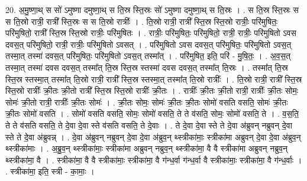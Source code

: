 \documentclass[17pt]{extarticle}
\begin{document}
20. अ॒मु॒ष्णा॒थ् स सो॑ ऽमुष्णा दमुष्णा॒थ् स ति॒स्र स्ति॒स्रः सो॑ ऽमुष्णा दमुष्णा॒थ् स ति॒स्रः । . स ति॒स्र स्ति॒स्रः स स ति॒स्रो रात्री॒ रात्री᳚ स्ति॒स्रः स स ति॒स्रो रात्रीः᳚ । . ति॒स्रो रात्री॒ रात्री᳚ स्ति॒स्र स्ति॒स्रो रात्रीः॒ परि॑मुषितः॒ परि॑मुषितो॒ रात्री᳚ स्ति॒स्र स्ति॒स्रो रात्रीः॒ परि॑मुषितः । . रात्रीः॒ परि॑मुषितः॒ परि॑मुषितो॒ रात्री॒ रात्रीः॒ परि॑मुषितो ऽवस दवस॒त् परि॑मुषितो॒ रात्री॒ रात्रीः॒ परि॑मुषितो ऽवसत् । . परि॑मुषितो ऽवस दवस॒त् परि॑मुषितः॒ परि॑मुषितो ऽवस॒त् तस्मा॒त् तस्मा॑ दवस॒त् परि॑मुषितः॒ परि॑मुषितो ऽवस॒त् तस्मा᳚त् । . परि॑मुषित॒ इति॒ परि॑ - मु॒षि॒तः॒ । . अ॒व॒स॒त् तस्मा॒त् तस्मा॑ दवस दवस॒त् तस्मा᳚त् ति॒स्र स्ति॒स्र स्तस्मा॑ दवस दवस॒त् तस्मा᳚त् ति॒स्रः । . तस्मा᳚त् ति॒स्र स्ति॒स्र स्तस्मा॒त् तस्मा᳚त् ति॒स्रो रात्री॒ रात्री᳚ स्ति॒स्र स्तस्मा॒त् तस्मा᳚त् ति॒स्रो रात्रीः᳚ । . ति॒स्रो रात्री॒ रात्री᳚ स्ति॒स्र स्ति॒स्रो रात्रीः᳚ क्री॒तः क्री॒तो रात्री᳚ स्ति॒स्र स्ति॒स्रो रात्रीः᳚ क्री॒तः । . रात्रीः᳚ क्री॒तः क्री॒तो रात्री॒ रात्रीः᳚ क्री॒तः सोमः॒ सोमः॑ क्री॒तो रात्री॒ रात्रीः᳚ क्री॒तः सोमः॑ । . क्री॒तः सोमः॒ सोमः॑ क्री॒तः क्री॒तः सोमो॑ वसति वसति॒ सोमः॑ क्री॒तः क्री॒तः सोमो॑ वसति । . सोमो॑ वसति वसति॒ सोमः॒ सोमो॑ वसति॒ ते ते व॑सति॒ सोमः॒ सोमो॑ वसति॒ ते । . व॒स॒ति॒ ते ते व॑सति वसति॒ ते दे॒वा दे॒वा स्ते व॑सति वसति॒ ते दे॒वाः । . ते दे॒वा दे॒वा स्ते ते दे॒वा अ॑ब्रुवन् नब्रुवन् दे॒वा स्ते ते दे॒वा अ॑ब्रुवन्न् । . दे॒वा अ॑ब्रुवन् नब्रुवन् दे॒वा दे॒वा अ॑ब्रुव॒न् थ्स्त्रीका॑माः॒ स्त्रीका॑मा अब्रुवन् दे॒वा दे॒वा अ॑ब्रुव॒न् थ्स्त्रीका॑माः । . अ॒ब्रु॒व॒न् थ्स्त्रीका॑माः॒ स्त्रीका॑मा अब्रुवन् नब्रुव॒न् थ्स्त्रीका॑मा॒ वै वै स्त्रीका॑मा अब्रुवन् नब्रुव॒न् थ्स्त्रीका॑मा॒ वै । . स्त्रीका॑मा॒ वै वै स्त्रीका॑माः॒ स्त्रीका॑मा॒ वै ग॑न्ध॒र्वा ग॑न्ध॒र्वा वै स्त्रीका॑माः॒ स्त्रीका॑मा॒ वै ग॑न्ध॒र्वाः । . स्त्रीका॑मा॒ इति॒ स्त्री - का॒माः॒ । \newline
\end{document}
